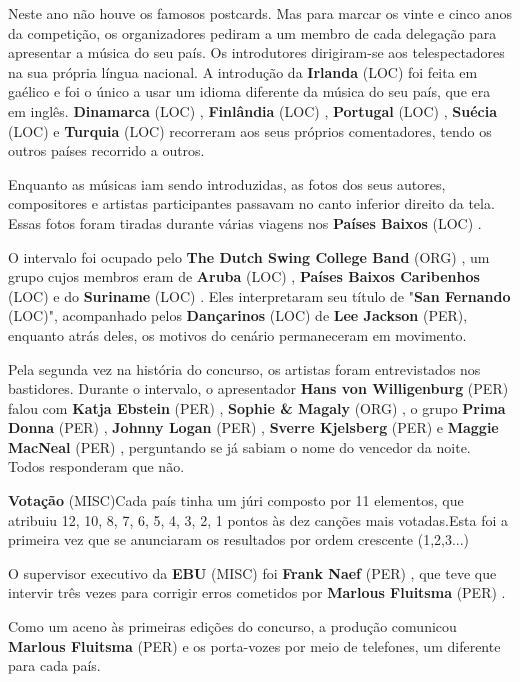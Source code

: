 \documentclass[12pt,a4paper]{article}
\begin{document}
Neste ano não houve os famosos postcards. Mas para marcar os vinte e cinco anos da competição, os organizadores pediram a um membro de cada delegação para apresentar a música do seu país. Os introdutores dirigiram-se aos telespectadores na sua própria língua nacional. A introdução da \textbf{Irlanda} (LOC) foi feita em gaélico e foi o único a usar um idioma diferente da música do seu país, que era em inglês. \textbf{Dinamarca} (LOC) , \textbf{Finlândia} (LOC) , \textbf{Portugal} (LOC) , \textbf{Suécia} (LOC) e \textbf{Turquia} (LOC) recorreram aos seus próprios comentadores, tendo os outros países recorrido a outros.

Enquanto as músicas iam sendo introduzidas, as fotos dos seus autores, compositores e artistas participantes passavam no canto inferior direito da tela. Essas fotos foram tiradas durante várias viagens nos \textbf{Países Baixos} (LOC) .

O intervalo foi ocupado pelo \textbf{The Dutch Swing College Band} (ORG) , um grupo cujos membros eram de \textbf{Aruba} (LOC) , \textbf{Países Baixos Caribenhos} (LOC) e do \textbf{Suriname} (LOC) . Eles interpretaram seu título de "\textbf{San Fernando} (LOC)", acompanhado pelos \textbf{Dançarinos} (LOC) de \textbf{Lee Jackson} (PER), enquanto atrás deles, os motivos do cenário permaneceram em movimento.

Pela segunda vez na história do concurso, os artistas foram entrevistados nos bastidores. Durante o intervalo, o apresentador \textbf{Hans von Willigenburg} (PER) falou com \textbf{Katja Ebstein} (PER) , \textbf{Sophie \& Magaly} (ORG) , o grupo \textbf{Prima Donna} (PER) , \textbf{Johnny Logan} (PER) , \textbf{Sverre Kjelsberg} (PER) e \textbf{Maggie MacNeal} (PER) , perguntando se já sabiam o nome do vencedor da noite. Todos responderam que não.



\textbf{Votação} (MISC)Cada país tinha um júri composto por 11 elementos, que atribuiu 12, 10, 8, 7, 6, 5, 4, 3, 2, 1 pontos às dez canções mais votadas.Esta foi a primeira vez que se anunciaram os resultados por ordem crescente (1,2,3...)

O supervisor executivo da \textbf{EBU} (MISC) foi \textbf{Frank Naef} (PER) , que teve que intervir três vezes para corrigir erros cometidos por \textbf{Marlous Fluitsma} (PER) .

Como um aceno às primeiras edições do concurso, a produção comunicou \textbf{Marlous Fluitsma} (PER) e os porta-vozes por meio de telefones, um diferente para cada país.
\end{document}

